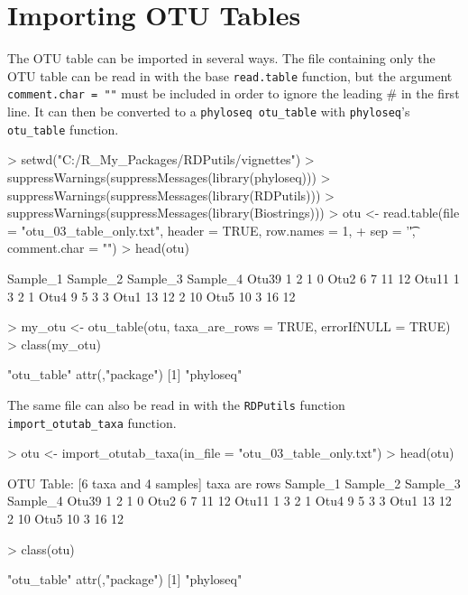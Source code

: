 \documentclass{article}
\begin{document}
\section*{Importing OTU Tables}

The OTU table can be imported in several ways. The file containing only the OTU table can be read in with the base \texttt{read.table} function, but the argument \texttt{comment.char = ""} must be included in order to ignore the leading \# in the first line. It can then be converted to a \texttt{phyloseq otu\_table} with \texttt{phyloseq}'s \texttt{otu\_table} function.  

\begin{Schunk}
\begin{Sinput}
> setwd("C:/R_My_Packages/RDPutils/vignettes")
> suppressWarnings(suppressMessages(library(phyloseq)))
> suppressWarnings(suppressMessages(library(RDPutils)))
> suppressWarnings(suppressMessages(library(Biostrings)))
> otu <- read.table(file = "otu_03_table_only.txt", header = TRUE, row.names = 1, 
+                   sep = '\t', comment.char = "")
> head(otu)
\end{Sinput}
\begin{Soutput}
      Sample_1 Sample_2 Sample_3 Sample_4
Otu39        1        2        1        0
Otu2         6        7       11       12
Otu11        1        3        2        1
Otu4         9        5        3        3
Otu1        13       12        2       10
Otu5        10        3       16       12
\end{Soutput}
\begin{Sinput}
> my_otu <- otu_table(otu, taxa_are_rows = TRUE, errorIfNULL = TRUE)
> class(my_otu)
\end{Sinput}
\begin{Soutput}
[1] "otu_table"
attr(,"package")
[1] "phyloseq"
\end{Soutput}
\end{Schunk}

The same file can also be read in with the \texttt{RDPutils} function \texttt{import\_otutab\_taxa} function.  

\begin{Schunk}
\begin{Sinput}
> otu <- import_otutab_taxa(in_file = "otu_03_table_only.txt")
> head(otu)
\end{Sinput}
\begin{Soutput}
OTU Table:          [6 taxa and 4 samples]
                     taxa are rows
      Sample_1 Sample_2 Sample_3 Sample_4
Otu39        1        2        1        0
Otu2         6        7       11       12
Otu11        1        3        2        1
Otu4         9        5        3        3
Otu1        13       12        2       10
Otu5        10        3       16       12
\end{Soutput}
\begin{Sinput}
> class(otu)
\end{Sinput}
\begin{Soutput}
[1] "otu_table"
attr(,"package")
[1] "phyloseq"
\end{Soutput}
\end{Schunk}
\end{document}
